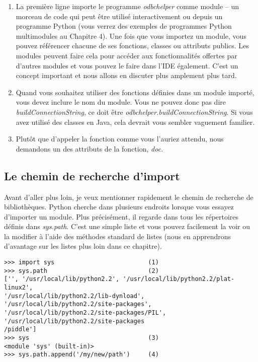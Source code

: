 \begin{enumerate}
\item{La première ligne importe le programme \emph{odbchelper} comme module -- un morceau de code qui peut être utilisé interactivement ou depuis un programme Python (vous verrez des exemples de programmes Python multimodules au Chapitre 4). Une fois que vous importez un module, vous pouvez référencer chacune de ses fonctions, classes ou attributs publics.
Les modules peuvent faire cela pour accéder aux fonctionnalités offertes par d'autres modules et vous pouvez le faire dans l'IDE également. C'est un concept important et nous allons en discuter plus amplement plus tard.}
\item{Quand vous souhaitez utiliser des fonctions définies dans un module importé, vous devez inclure le nom du module. Vous ne pouvez donc pas dire \emph{buildConnectionString}, ce doit être \emph{odbchelper.buildConnectionString}. Si vous avez utilisé des classes en Java, cela devrait vous sembler vaguement familier.}
\item{Plutôt que d'appeler la fonction comme vous l'auriez attendu, nous demandons un des attributs de la fonction, \emph{doc.}}
\end{enumerate}


\subsection{Le chemin de recherche d'import}
Avant d'aller plus loin, je veux mentionner rapidement le chemin de recherche de bibliothèques. Python cherche dans plusieurs endroits lorsque vous essayez d'importer un module. Plus précisément, il regarde dans tous les répertoires définis dans \emph{sys.path}. C'est une simple liste et vous pouvez facilement la voir ou la modifier à l'aide des méthodes standard de listes (nous en apprendrons d'avantage sur les listes plus loin dans ce chapitre).

\begin{example}
\begin{lstlisting}
>>> import sys                          (1)
>>> sys.path                            (2)
['', '/usr/local/lib/python2.2', '/usr/local/lib/python2.2/plat-linux2',
'/usr/local/lib/python2.2/lib-dynload', '/usr/local/lib/python2.2/site-packages',
'/usr/local/lib/python2.2/site-packages/PIL', '/usr/local/lib/python2.2/site-packages
/piddle']
>>> sys                                 (3)
<module 'sys' (built-in)>
>>> sys.path.append('/my/new/path')     (4)
\end{lstlisting}
\end{example}

